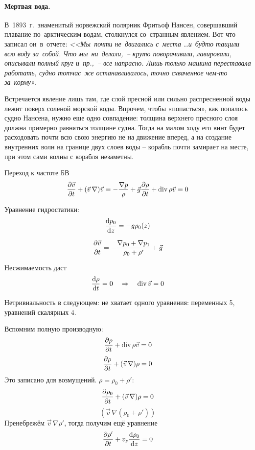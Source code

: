 \paragraph{Мертвая вода.} В 1893 г. знаменитый норвежский полярник Фритьоф Нансен, совершавший плавание по арктическим водам, столкнулся со странным явлением. Вот что записал он в отчете: \textit{<<Мы почти не двигались с места \dots и будто тащили всю воду за собой. Что мы ни делали, -- круто поворачивали, лавировали, описывали полный круг и пр., -- все напрасно. Лишь только машина переставала работать, судно тотчас же останавливалось, точно схваченное чем-то за корму».}

Встречается явление лишь там, где слой пресной или
сильно распресненной воды лежит поверх соленой морской воды.
Впрочем, чтобы «попасться», как попалось судно Нансена, нужно еще одно
совпадение: толщина верхнего пресного слоя должна примерно
равняться толщине судна. Тогда на малом ходу его винт будет
расходовать почти всю свою энергию не на движение вперед,
а на создание внутренних волн на границе двух слоев воды -- корабль
почти замирает на месте, при этом сами волны с корабля незаметны.

Переход к частоте БВ
\begin{equation}
    \pdv{\vec{v}}{t}+(\vec{v}\,\nabla)\vec{v} = -\frac{\nabla p}{\rho}+\vec{g}\\
    \pdv{\rho}{t}+\operatorname{div} \rho \vec{v} = 0
\end{equation}

Уравнение гидростатики:
\begin{equation}
    \dv{p_0}{z} = -g \rho_0(z)
\end{equation}

\begin{equation}
    \pdv{\vec{v}}{t} = -\frac{\nabla p_0+\nabla p_1}{\rho_0+\rho'}+\vec{g}
\end{equation}

Несжимаемость даст
\begin{equation}
    \dv{\rho}{t} = 0 \quad \Rightarrow \quad
    \operatorname{div} \vec{v} = 0
\end{equation}

Нетривиальность в следующем: не хватает одного уравнения: переменных 5, уравнений скалярных 4.

Вспомним полную производную:
\begin{equation}
    \pdv{\rho}{t}+\operatorname{div} \rho \vec{v} = 0
\end{equation}
\begin{equation}
    \pdv{\rho}{t}+(\vec{v}\,\nabla)\rho = 0
\end{equation}
Это записано для возмущений. $\rho = \rho_0+\rho'$:
\begin{equation}
    \pdv{\rho_0}{t}+(\vec{v}\,\nabla)\rho = 0
\end{equation}
\begin{equation}
    (\vec{v}\,\nabla(\rho_0+\rho'))
\end{equation}
Пренебрежём $\vec{v}\,\nabla \rho'$, тогда получим ещё уравнение
\begin{equation}
    \pdv{\rho'}{t}+v_z\dv{\rho_0}{z} = 0
\end{equation}

